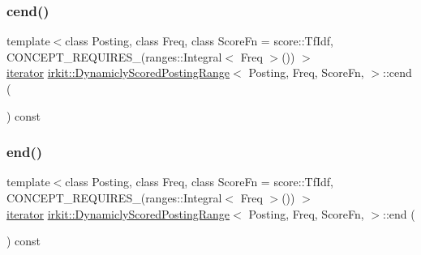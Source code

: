 \subsubsection{\texorpdfstring{cend()}{cend()}}
{\footnotesize\ttfamily template$<$class Posting, class Freq, class Score\+Fn = score\+::\+Tf\+Idf, C\+O\+N\+C\+E\+P\+T\+\_\+\+R\+E\+Q\+U\+I\+R\+E\+S\+\_\+(ranges\+::\+Integral$<$ Freq $>$()) $>$ \\
\hyperlink{classirkit_1_1DynamiclyScoredPostingRange_1_1iterator}{iterator} \hyperlink{classirkit_1_1DynamiclyScoredPostingRange}{irkit\+::\+Dynamicly\+Scored\+Posting\+Range}$<$ Posting, Freq, Score\+Fn, $>$\+::cend (\begin{DoxyParamCaption}{ }\end{DoxyParamCaption}) const\hspace{0.3cm}{\ttfamily [inline]}}

\mbox{\label{classirkit_1_1DynamiclyScoredPostingRange_a6d0857abfae0edcf8a2c5d63916dfbb1}} 
\subsubsection{\texorpdfstring{end()}{end()}}
{\footnotesize\ttfamily template$<$class Posting, class Freq, class Score\+Fn = score\+::\+Tf\+Idf, C\+O\+N\+C\+E\+P\+T\+\_\+\+R\+E\+Q\+U\+I\+R\+E\+S\+\_\+(ranges\+::\+Integral$<$ Freq $>$()) $>$ \\
\hyperlink{classirkit_1_1DynamiclyScoredPostingRange_1_1iterator}{iterator} \hyperlink{classirkit_1_1DynamiclyScoredPostingRange}{irkit\+::\+Dynamicly\+Scored\+Posting\+Range}$<$ Posting, Freq, Score\+Fn, $>$\+::end (\begin{DoxyParamCaption}{ }\end{DoxyParamCaption}) const\hspace{0.3cm}{\ttfamily [inline]}}

\mbox{\label{classirkit_1_1DynamiclyScoredPostingRange_a3a080b946216c0caf02eb9749c8e2e2e}} 
